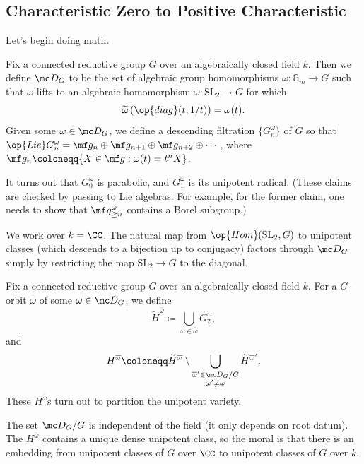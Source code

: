 \documentclass[../notes.tex]{subfiles}
\begin{document}
\subsection{Characteristic Zero to Positive Characteristic}
Let's begin doing math.
\begin{notation}
	Fix a connected reductive group $G$ over an algebraically closed field $k$. Then we define $\mc D_G$ to be the set of algebraic group homomorphisms $\omega\colon\mathbb G_m\to G$ such that $\omega$ lifts to an algebraic homomorphism $\widetilde\omega\colon\mathrm{SL}_2\to G$ for which
	\[\widetilde\omega\left(\op{diag}(t,1/t)\right)=\omega(t).\]
	Given some $\omega\in\mc D_G$, we define a descending filtration $\{G_n^\omega\}$ of $G$ so that $\op{Lie}G_n^\omega=\mf g_n\oplus\mf g_{n+1}\oplus\mf g_{n+2}\oplus\cdots$, where $\mf g_n\coloneqq\{X\in\mf g:\omega(t)=t^nX\}$.
\end{notation}
\begin{remark}
	It turns out that $G_0^\omega$ is parabolic, and $G_1^\omega$ is its unipotent radical. (These claims are checked by passing to Lie algebras. For example, for the former claim, one needs to show that $\mf g_{\ge n}^\omega$ contains a Borel subgroup.) %
\end{remark}
\begin{remark}
	We work over $k=\CC$. The natural map from $\op{Hom}(\mathrm{SL}_2,G)$ to unipotent classes (which descends to a bijection up to conjugacy) factors through $\mc D_G$ simply by restricting the map $\mathrm{SL}_2\to G$ to the diagonal. %
\end{remark}
\begin{notation}
	Fix a connected reductive group $G$ over an algebraically closed field $k$. For a $G$-orbit $\overline\omega$ of some $\omega\in\mc D_G$, we define
	\[\widetilde H^{\overline\omega}\coloneqq\bigcup_{\omega\in\overline\omega}G_2^\omega,\]
	and
	\[H^{\overline\omega}\coloneqq\widetilde H^{\overline\omega}\setminus\bigcup_{\substack{\overline\omega'\in\mc D_G/G\\\overline\omega'\ne\overline\omega}}\widetilde H^{\overline\omega'}.\]
	These $H^{\overline\omega}$s turn out to partition the unipotent variety.
\end{notation}
\begin{remark}
	The set $\mc D_G/G$ is independent of the field (it only depends on root datum). The $H^{\overline\omega}$ contains a unique dense unipotent class, so the moral is that there is an embedding from unipotent classes of $G$ over $\CC$ to unipotent classes of $G$ over $k$.
\end{remark}
\end{document}
